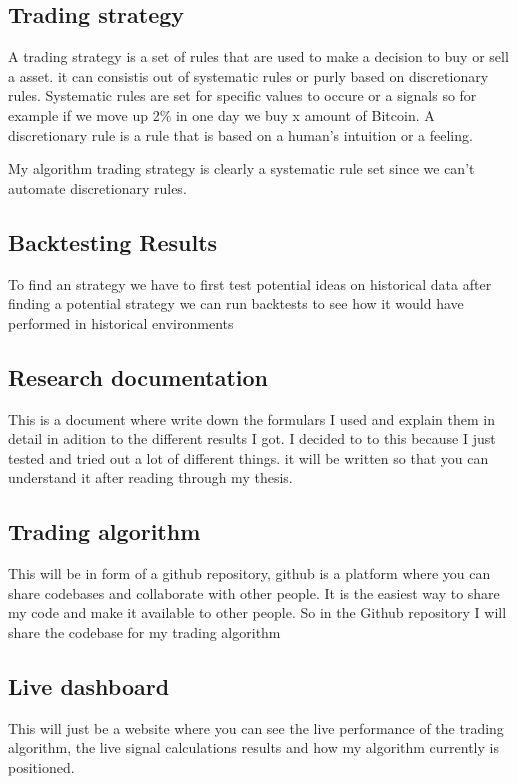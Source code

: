 \documentclass[12pt]{article}
\begin{document}
\subsection{Trading strategy}
A trading strategy is a set of rules that are used to make a decision to buy or sell a asset. it can consistis out of systematic rules or purly based on discretionary rules.
Systematic rules are set for specific values to occure or a signals so for example if we move up 2\% in one day we buy x amount of Bitcoin. A discretionary rule is a rule that is based on a human's intuition or a feeling.

My algorithm trading strategy is clearly a systematic rule set since we can't automate discretionary rules.

\subsection{Backtesting Results}
To find an strategy we have to first test potential ideas on historical data after finding a potential strategy we can run backtests to see how it would have performed in historical environments




\subsection{Research documentation}
This is a document where write down the formulars I used and explain them in detail in adition to the different results I got. I decided to to this because I just tested and tried out a lot of different things. it will be written so that you can understand it after reading through my thesis.



\subsection{Trading algorithm}
This will be in form of a github repository, github is a platform where you can share codebases and collaborate with other people.
It is the easiest way to share my code and make it available to other people. So in the Github repository I will share the codebase for my trading algorithm


\subsection{Live dashboard}
This will just be a website where you can see the live performance of the trading algorithm, the live signal calculations results and how my algorithm currently is positioned.
\end{document}
